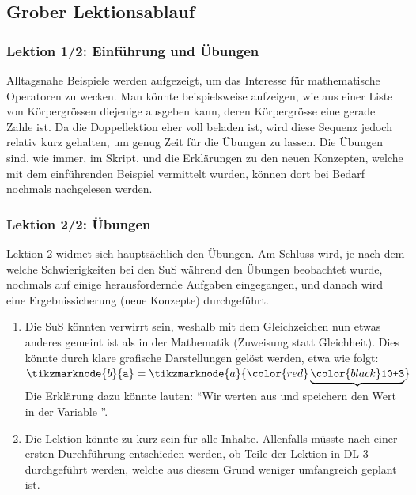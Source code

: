 \begin{myExBox}[title=DL \themycounter]
\subsection*{Grober Lektionsablauf}
\subsubsection*{Lektion 1/2: Einführung und Übungen}
Alltagsnahe Beispiele werden aufgezeigt, um das Interesse für mathematische Operatoren zu wecken. Man könnte beispielsweise aufzeigen, wie aus einer Liste von Körpergrössen diejenige ausgeben kann, deren Körpergrösse eine gerade Zahle ist. Da die Doppellektion eher voll beladen ist, wird diese Sequenz jedoch relativ kurz gehalten, um genug Zeit für die Übungen zu lassen. Die Übungen sind, wie immer, im Skript, und die Erklärungen zu den neuen Konzepten, welche mit dem einführenden Beispiel vermittelt wurden, können dort bei Bedarf nochmals nachgelesen werden.

\subsubsection*{Lektion 2/2: Übungen}
Lektion 2 widmet sich hauptsächlich den Übungen. Am Schluss wird, je nach dem welche Schwierigkeiten bei den SuS während den Übungen beobachtet wurde, nochmals auf einige herausfordernde Aufgaben eingegangen, und danach wird eine Ergebnissicherung (neue Konzepte) durchgeführt.

\begin{myExBox}[title=Mögliche Schwierigkeiten \& geeignete Massnahmen]
\begin{enumerate}
    \item Die SuS könnten verwirrt sein, weshalb mit dem Gleichzeichen nun etwas anderes gemeint ist als in der Mathematik (Zuweisung statt Gleichheit). Dies könnte durch klare grafische Darstellungen gelöst werden, etwa wie folgt: $  \tikzmarknode{b}{\text{\texttt{a}}} =\tikzmarknode{a}{\color{red}\underbrace{\color{black}\text{\texttt{10+3}}}}
        $
	Die Erklärung dazu könnte lauten: ``Wir werten  aus und speichern den Wert  in der Variable ''.
	\item Die Lektion könnte zu kurz sein für alle Inhalte. Allenfalls müsste nach einer ersten Durchführung entschieden werden, ob Teile der Lektion in DL 3 durchgeführt werden, welche aus diesem Grund weniger umfangreich geplant ist.
\end{enumerate}
\end{myExBox}
\end{myExBox}
\newpage{}

